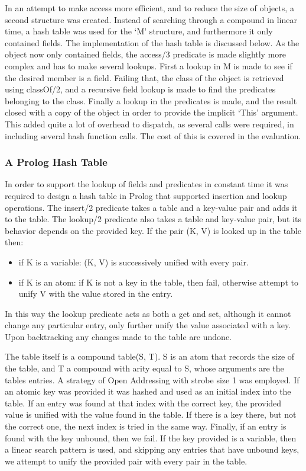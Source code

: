 \documentclass[12pt,a4paper,twoside,openright]{report}
\begin{document}
In an attempt to make access more efficient, and to reduce the size of objects, a second structure was created. Instead of searching through a compound in linear time, a hash table was used for the `M' structure, and furthermore it only contained fields. The implementation of the hash table is discussed below. As the object now only contained fields, the access/3 predicate is made slightly more complex and has to make several lookups. First a lookup in M is made to see if the desired member is a field. Failing that, the class of the object is retrieved using classOf/2, and a recursive field lookup is made to find the predicates belonging to the class. Finally a lookup in the predicates is made, and the result closed with a copy of the object in order to provide the implicit `This' argument. This added quite a lot of overhead to dispatch, as several calls were required, in including several hash function calls. The cost of this is covered in the evaluation.
		
		\subsubsection{A Prolog Hash Table}

In order to support the lookup of fields and predicates in constant time it was required to design a hash table in Prolog that supported insertion and lookup operations. The insert/2 predicate takes a table and a key-value pair and adds it to the table. The lookup/2 predicate also takes a table and key-value pair, but its behavior depends on the provided key. If the pair (K, V) is looked up in the table then:

\begin{itemize}
	\item if K is a variable: (K, V) is successively unified with every pair.
	\item if K is an atom: if K is not a key in the table, then fail, otherwise attempt to unify V with the value stored in the entry.
\end{itemize}

In this way the lookup predicate acts as both a get and set, although it cannot change any particular entry, only further unify the value associated with a key. Upon backtracking any changes made to the table are undone.

\bigskip

The table itself is a compound table(S, T). S is an atom that records the size of the table, and T a compound with arity equal to S, whose arguments are the tables entries. A strategy of Open Addressing with strobe size 1 was employed. If an atomic key was provided it was hashed and used as an initial index into the table. If an entry was found at that index with the correct key, the provided value is unified with the value found in the table. If there is a key there, but not the correct one, the next index is tried in the same way. Finally, if an entry is found with the key unbound, then we fail. If the key provided is a variable, then a linear search pattern is used, and skipping any entries that have unbound keys, we attempt to unify the provided pair with every pair in the table. 
\end{document}

